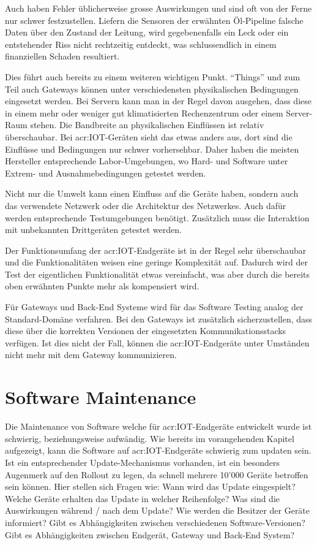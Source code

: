 Auch haben Fehler üblicherweise grosse Auswirkungen und sind oft von der Ferne nur schwer festzustellen. Liefern die Sensoren der erwähnten Öl-Pipeline falsche Daten über den Zustand der Leitung, wird gegebenenfalls ein Leck oder ein entstehender Riss nicht rechtzeitig entdeckt, was schlussendlich in einem finanziellen Schaden resultiert.

Dies führt auch bereits zu einem weiteren wichtigen Punkt. "`Things"' und zum Teil auch Gateways können unter verschiedensten physikalischen Bedingungen eingesetzt werden. Bei Servern kann man in der Regel davon ausgehen, dass diese in einem mehr oder weniger gut klimatisierten Rechenzentrum oder einem Server-Raum stehen. Die Bandbreite an physikalischen Einflüssen ist relativ überschaubar. Bei \gls{acr:IOT}-Geräten sieht das etwas anders aus, dort sind die Einflüsse und Bedingungen nur schwer vorhersehbar. Daher haben die meisten Hersteller entsprechende Labor-Umgebungen, wo Hard- und Software unter Extrem- und Ausnahmebedingungen getestet werden.

Nicht nur die Umwelt kann einen Einfluss auf die Geräte haben, sondern auch das verwendete Netzwerk oder die Architektur des Netzwerkes. Auch dafür werden entsprechende Testumgebungen benötigt. Zusätzlich muss die Interaktion mit unbekannten Drittgeräten getestet werden.

Der Funktionsumfang der \gls{acr:IOT}-Endgeräte ist in der Regel sehr überschaubar und die Funktionalitäten weisen eine geringe Komplexität auf. Dadurch wird der Test der eigentlichen Funktionalität etwas vereinfacht, was aber durch die bereits oben erwähnten Punkte mehr als kompensiert wird.


Für Gateways und Back-End Systeme wird für das Software Testing analog der Standard-Domäne verfahren. Bei den Gateways ist zusätzlich sicherzustellen, dass diese über die korrekten Versionen der eingesetzten Kommunikationsstacks verfügen. Ist dies nicht der Fall, können die \gls{acr:IOT}-Endgeräte unter Umständen nicht mehr mit dem Gateway kommunizieren.


\section{Software Maintenance}
Die Maintenance von Software welche für \gls{acr:IOT}-Endgeräte entwickelt wurde ist schwierig, beziehungsweise aufwändig. Wie bereits im vorangehenden Kapitel aufgezeigt, kann die Software auf \gls{acr:IOT}-Endgeräte schwierig zum updaten sein. Ist ein entsprechender Update-Mechanismus vorhanden, ist ein besonders Augenmerk auf den Rollout zu legen, da schnell mehrere 10'000 Geräte betroffen sein können. Hier stellen sich Fragen wie: Wann wird das Update eingespielt? Welche Geräte erhalten das Update in welcher Reihenfolge? Was sind die Auswirkungen während / nach dem Update? Wie werden die Besitzer der Geräte informiert? Gibt es Abhängigkeiten zwischen verschiedenen Software-Versionen? Gibt es Abhängigkeiten zwischen Endgerät, Gateway und Back-End System?

